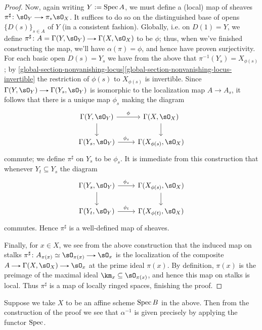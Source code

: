 \begin{proposition}
\begin{proof}
    Now, again writing $Y \mathrel{:=} \operatorname{Spec} A$, we must define a (local) map of sheaves $\pi^\sharp \c \sO_Y \to \pi_*\sO_X$. It suffices to do so on the distinguished base of opens $\{D(s)\}_{s \in A}$ of $Y$ (in a consistent fashion). Globally, i.e. on $D(1) = Y$, we define $\pi^\sharp \c A = \Gamma(Y,\sO_Y) \to \Gamma(X,\sO_X)$ to be $\phi$; thus, when we've finished constructing the map, we'll have $\alpha(\pi) = \phi$, and hence have proven surjectivity. For each basic open $D(s) = Y_s$ we have from the above that $\pi^{-1}(Y_s) = X_{\phi(s)}$; by \cref{global-section-nonvanishing-locus}\cref{global-section-nonvanishing-locus-invertible} the restriction of $\phi(s)$ to $X_{\phi(s)}$ is invertible. Since $\Gamma(Y,\sO_Y) \to \Gamma(Y_s,\sO_Y)$ is isomorphic to the localization map $A \to A_s$, it follows that there is a unique map $\phi_s$ making the diagram
    \[
      \begin{tikzcd}
        \Gamma(Y,\sO_Y) \ar[r, "\phi"] \ar[d] &
        \Gamma(X,\sO_X) \ar[d] \\
        \Gamma(Y_s,\sO_Y) \ar[r, "\phi_s"] &
        \Gamma(X_{\phi(s)},\sO_X)
      \end{tikzcd}
    \]
    commute; we define $\pi^\sharp$ on $Y_s$ to be $\phi_s$. It is immediate from this construction that whenever $Y_t \subseteq Y_s$ the diagram
    \[
      \begin{tikzcd}
        \Gamma(Y_s,\sO_Y) \ar[r, "\phi_s"] \ar[d] &
        \Gamma(X_{\phi(s)},\sO_X) \ar[d] \\
        \Gamma(Y_t,\sO_Y) \ar[r, "\phi_t"] &
        \Gamma(X_{\phi(t)},\sO_X)
      \end{tikzcd}
    \]
    commutes. Hence $\pi^\sharp$ is a well-defined map of sheaves.
    
    Finally, for $x \in X$, we see from the above construction that the induced map on stalks $\pi^\sharp \c A_{\pi(x)} \iso \sO_{\pi(x)} \to \sO_x$ is the localization of the composite $A \to \Gamma(X,\sO_X) \to \sO_x$ at the prime ideal $\pi(x)$. By definition, $\pi(x)$ is the preimage of the maximal ideal $\km_x \subseteq \sO_{\pi(x)}$, and hence this map on stalks is local. Thus $\pi^\sharp$ is a map of locally ringed spaces, finishing the proof.
  \end{proof}

  \begin{subremark}
    \label{affine-adjunction-affine-case}
    Suppose we take $X$ to be an affine scheme $\operatorname{Spec} B$ in the above. Then from the construction of the proof we see that $\alpha^{-1}$ is given precisely by applying the functor $\operatorname{Spec}$.
  \end{subremark}


\end{proposition}
